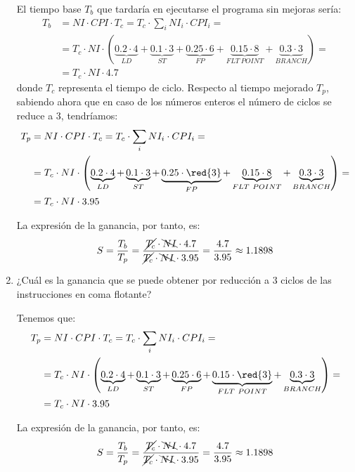\begin{ejercicio}
\begin{enumerate}
        El tiempo base $T_b$ que tardaría en ejecutarse el programa sin mejoras sería:
        \begin{align*}
            T_b &= NI \cdot CPI \cdot T_c = T_c \cdot \sum_{i} NI_i \cdot CPI_i
            =\\&= T_c \cdot NI \cdot \left(\underbrace{0.2 \cdot 4}_{LD} + \underbrace{0.1 \cdot 3}_{ST} + \underbrace{0.25 \cdot 6}_{FP} + \underbrace{0.15 \cdot 8}_{FLT~POINT} + \underbrace{ 0.3 \cdot 3}_{BRANCH}\right) =\\&= T_c \cdot NI \cdot 4.7
        \end{align*}
        donde $T_c$ representa el tiempo de ciclo. Respecto al tiempo mejorado $T_p$, sabiendo ahora
        que en caso de los números enteros el número de ciclos se reduce a 3, tendríamos:
        \begin{align*}
            T_p &= NI \cdot CPI \cdot T_c = T_c \cdot \sum_{i} NI_i \cdot CPI_i
            =\\&= T_c \cdot NI \cdot \left(\underbrace{0.2 \cdot 4}_{LD} + \underbrace{0.1 \cdot 3}_{ST} + \underbrace{0.25 \cdot \red{3}}_{FP} + \underbrace{0.15 \cdot 8}_{FLT~POINT} + \underbrace{ 0.3 \cdot 3}_{BRANCH}\right) =\\& = T_c \cdot NI \cdot 3.95
        \end{align*}

        La expresión de la ganancia, por tanto, es:
        \begin{equation*}
            S = \dfrac{T_b}{T_p} = \dfrac{\cancel{T_c} \cdot \bcancel{NI} \cdot 4.7}{\cancel{T_c} \cdot \bcancel{NI} \cdot 3.95} = \frac{4.7}{3.95} \approx 1.1898
        \end{equation*}

        \item ¿Cuál es la ganancia que se puede obtener por reducción a 3 ciclos de las instrucciones en coma flotante?
        
        Tenemos que:
        \begin{align*}
            T_p &= NI \cdot CPI \cdot T_c = T_c \cdot \sum_{i} NI_i \cdot CPI_i
            =\\&= T_c \cdot NI \cdot \left(\underbrace{0.2 \cdot 4}_{LD} + \underbrace{0.1 \cdot 3}_{ST} + \underbrace{0.25 \cdot 6}_{FP} + \underbrace{0.15 \cdot \red{3}}_{FLT~POINT} + \underbrace{ 0.3 \cdot 3}_{BRANCH}\right) =\\&= T_c \cdot NI \cdot 3.95
        \end{align*}

        La expresión de la ganancia, por tanto, es:
        \begin{equation*}
            S = \dfrac{T_b}{T_p} = \dfrac{\cancel{T_c} \cdot \bcancel{NI} \cdot 4.7}{\cancel{T_c} \cdot \bcancel{NI} \cdot 3.95} = \frac{4.7}{3.95} \approx 1.1898
        \end{equation*}


\end{enumerate}
\end{ejercicio}
